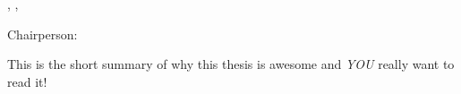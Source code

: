 


\noindent \melastfirst, \mycurrentdegreeabbrev, \mygradmonth \ \ \mygradyear
\makebox[3.5in][r]{\mymajordept}
\vskip 11pt
\noindent \mytitle

\vskip 11pt

\noindent Chairperson: \chairname

\begin{singlespace}

This is the short summary of why this thesis is awesome and \emph{YOU} really want to read it!

\end{singlespace}


